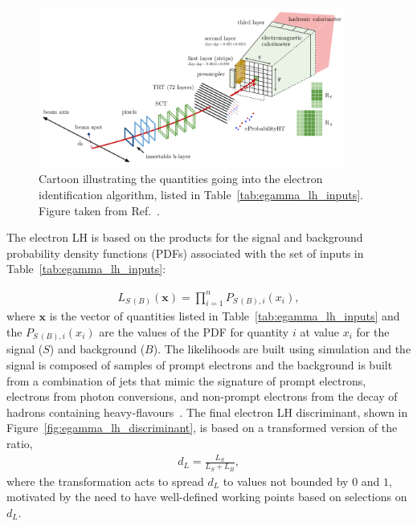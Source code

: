 \begin{figure}[!htb]
    \begin{center}
        \includegraphics[width=0.9\textwidth]{figures/chapter3/egamma/egamma_lh_input_desc}
        \caption{
            Cartoon illustrating the quantities going into the electron identification algorithm,
            listed in Table~\ref{tab:egamma_lh_inputs}.
            Figure taken from Ref.~\cite{Aaboud:2657964}.
        }
        \label{fig:egamma_lh_input_desc}
    \end{center}
\end{figure}

The electron LH is based on the products for the signal and background probability density
functions (PDFs) associated with the set of inputs in Table~\ref{tab:egamma_lh_inputs}:

\begin{align}
    L_{S\,(B)}(\mathbf{x}) = \prod\limits_{i=1}^n P_{S\,(B),i} (x_i),
    \label{eq:egamma_lh}
\end{align}
where $\mathbf{x}$ is the vector of quantities listed in Table~\ref{tab:egamma_lh_inputs} and
the $P_{S\,(B),i}(x_i)$ are the values of the PDF for quantity $i$ at value $x_i$ for the
signal ($S$) and background ($B$).
The likelihoods are built using simulation and the signal is composed of samples of prompt electrons
and the background is built from a combination of jets that mimic the signature of
prompt electrons, electrons from photon conversions, and non-prompt electrons from the decay
of hadrons containing heavy-flavours~\cite{Aad:2019tso}.
The final electron LH discriminant, shown in Figure~\ref{fig:egamma_lh_discriminant}, is based on a transformed version of the ratio,
\begin{align}
    d_L = \frac{L_S}{L_S + L_B},
    \label{eq:egamma_lh_disc}
\end{align}
where the transformation acts to spread $d_L$ to values not bounded by $0$ and $1$,
motivated by the need to have well-defined working points based on selections on $d_L$.

